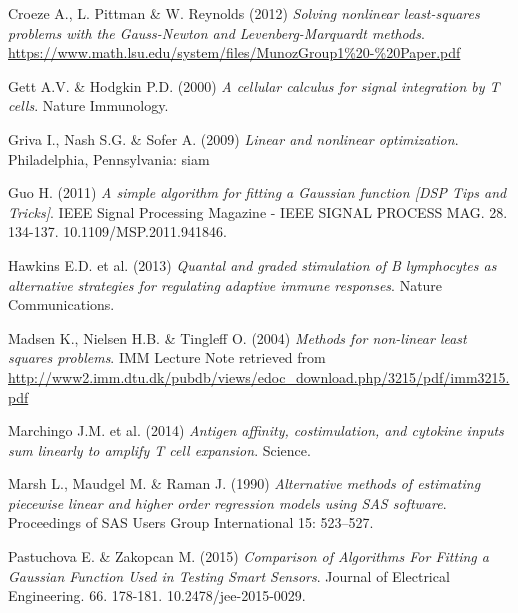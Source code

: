 \documentclass{article}
\newcommand{\enterProblemHeader}[1]{
}
\newcommand{\exitProblemHeader}[1]{
}
\newcounter{homeworkProblemCounter} %
\newcommand{\homeworkProblemName}{}
\newenvironment{homeworkProblem}[1][Problem \arabic{homeworkProblemCounter}]{ %
\stepcounter{homeworkProblemCounter} %
\renewcommand{\homeworkProblemName}{#1} %
\section{\homeworkProblemName} %
\enterProblemHeader{\homeworkProblemName} %
}{
\exitProblemHeader{\homeworkProblemName} %
}
\begin{document}


\clearpage
\begin{thebibliography}{9}
Croeze A., L. Pittman \& W. Reynolds (2012)
\textit{Solving nonlinear least-squares problems with the Gauss-Newton and Levenberg-Marquardt methods}.
\url{https://www.math.lsu.edu/system/files/MunozGroup1%20-%20Paper.pdf}

Gett A.V. \& Hodgkin P.D. (2000)
\textit{A cellular calculus for signal integration by T cells}.
Nature Immunology.

Griva I., Nash S.G. \& Sofer A. (2009)
\textit{Linear and nonlinear optimization}.
Philadelphia, Pennsylvania: siam

Guo H. (2011)
\textit{A simple algorithm for fitting a Gaussian function [DSP Tips and Tricks]}.
IEEE Signal Processing Magazine - IEEE SIGNAL PROCESS MAG. 28. 134-137. 10.1109/MSP.2011.941846.

Hawkins E.D. et al. (2013)
\textit{Quantal and graded stimulation of B lymphocytes as alternative strategies for regulating adaptive immune responses}.
Nature Communications.

Madsen K., Nielsen H.B. \& Tingleff O. (2004)
\textit{Methods for non-linear least squares problems}.
IMM Lecture Note retrieved from \url{http://www2.imm.dtu.dk/pubdb/views/edoc_download.php/3215/pdf/imm3215.pdf}

Marchingo J.M. et al. (2014)
\textit{Antigen affinity, costimulation, and cytokine inputs sum linearly to amplify T cell expansion}.
Science.

Marsh L., Maudgel M. \& Raman J. (1990)
\textit{Alternative methods of estimating piecewise linear and higher order regression models using SAS software}.
Proceedings of SAS Users Group International 15: 523–527.

Pastuchova E. \& Zakopcan M. (2015)
\textit{Comparison of Algorithms For Fitting a Gaussian Function Used in Testing Smart Sensors}.
Journal of Electrical Engineering. 66. 178-181. 10.2478/jee-2015-0029.


\end{thebibliography}
\end{document}

